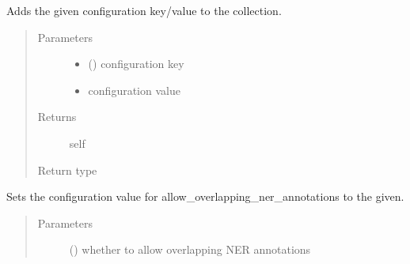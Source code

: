 \documentclass[letterpaper,10pt,english]{sphinxmanual}
\begin{document}
\begin{fulllineitems}
\begin{fulllineitems}
\label{\detokenize{autoapi/pine/client/index:pine.client.CollectionBuilder.configuration}}
Adds the given configuration key/value to the collection.
\begin{quote}\begin{description}
\item[{Parameters}] \leavevmode\begin{itemize}
\item {} 
 () \textendash{} configuration key

\item {} 
 \textendash{} configuration value

\end{itemize}

\item[{Returns}] \leavevmode
self

\item[{Return type}] \leavevmode
{\hyperref[\detokenize{autoapi/pine/client/models/index:pine.client.models.CollectionBuilder}]{}}

\end{description}\end{quote}

\end{fulllineitems}


\begin{fulllineitems}
\label{\detokenize{autoapi/pine/client/index:pine.client.CollectionBuilder.allow_overlapping_ner_annotations}}
Sets the configuration value for allow\_overlapping\_ner\_annotations to the given.
\begin{quote}\begin{description}
\item[{Parameters}] \leavevmode
{} () \textendash{} whether to allow overlapping NER annotations


\end{description}
\end{quote}
\end{fulllineitems}
\end{fulllineitems}
\end{document}
